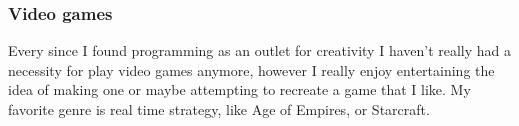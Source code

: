 \documentclass{article}
\begin{document}
\subsubsection{Video games}

Every since I found programming as an outlet for creativity I haven't really had a necessity for play video games anymore, however I really enjoy entertaining the idea of making one or maybe attempting to recreate a game that I like. My favorite genre is real time strategy, like Age of Empires, or Starcraft.



    
\end{document}
